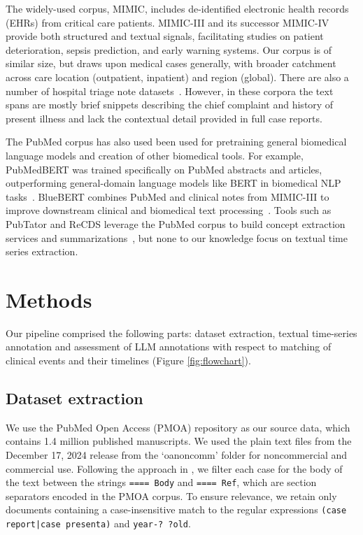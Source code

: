 \documentclass[pmlr]{jmlr}%
\begin{document}
The widely-used corpus, MIMIC, includes de-identified electronic health records (EHRs) from critical care patients.  MIMIC-III and its successor MIMIC-IV provide both structured and textual signals, facilitating studies on patient deterioration, sepsis prediction, and early warning systems.  Our corpus is of similar size, but draws upon medical cases generally, with broader catchment across care location (outpatient, inpatient) and region (global). 
There are also a number of hospital triage note datasets~\citep{stewart2023applications}. However, in these corpora the text spans are mostly brief snippets describing the chief complaint and history of present illness and lack the contextual detail provided in full case reports.

The PubMed corpus has also used been used for pretraining general biomedical language models and creation of other biomedical tools.
For example, PubMedBERT was trained specifically on PubMed abstracts and articles, outperforming general-domain language models like BERT in biomedical NLP tasks~\citep{gu2021domain}.
BlueBERT combines PubMed and clinical notes from MIMIC-III to improve downstream clinical and biomedical text processing~\citep{peng2020empirical}.
Tools such as PubTator and ReCDS leverage the PubMed corpus to build concept extraction services and summarizations~\citep{wei2024pubtator,zhao2023large}, but none to our knowledge focus on textual time series extraction.


\section{Methods}

Our pipeline comprised the following parts: dataset extraction, textual time-series annotation and assessment of LLM annotations with respect to matching of clinical events and their timelines (Figure \ref{fig:flowchart}).

\subsection{Dataset extraction}

\sloppy We use the PubMed Open Access (PMOA) repository as our source data, which contains 1.4 million published manuscripts.  
We used the plain text files from the December 17, 2024 release from the `oa\textunderscore noncomm' folder for noncommercial and commercial use.
Following the approach in \cite{wang2025large}, we filter each case for the body of the text between the strings \texttt{==== Body} and \texttt{==== Ref}, which are section separators encoded in the PMOA corpus. To ensure relevance, we retain only documents containing a case-insensitive match to the regular expressions \texttt{(case report|case presenta)} and \texttt{year-? ?old}.
\end{document}
